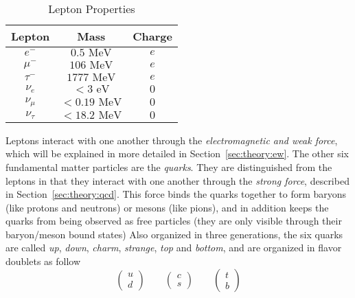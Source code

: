 \begin{table}[h!]
\begin{center}
\begin{tabular}{|c|c|c|}%
\hline
Lepton        & Mass           & Charge \\%
\hline
$e^{-}$      & $0.5 \mbox{ MeV}$      & $e$ \\%
$\mu^{-}$    & $106 \mbox{ MeV}$      & $e$ \\%
$\tau^{-}$   & $1777 \mbox{ MeV}$     & $e$ \\%
\hline                                      
$\nu_{e}$    & $< 3 \mbox{ eV}$       & $0$ \\%
$\nu_{\mu}$  & $< 0.19 \mbox{ MeV}$   & $0$ \\%
$\nu_{\tau}$ & $< 18.2 \mbox{ MeV}$   & $0$  \\%
\hline
\end{tabular}
\end{center}
\caption{Lepton Properties}
\label{table:theory:lepprop}
\end{table}
Leptons interact with one another through the \emph{electromagnetic and weak force}, which will be explained in more detailed in Section~\ref{sec:theory:ew}.\newline
The other six fundamental matter particles are the \emph{quarks}. They are distinguished from the leptons in that they interact with one another through the \emph{strong force}, described in Section~\ref{sec:theory:qcd}. This force binds the quarks together to form baryons (like protons and neutrons) or mesons (like pions), and in addition keeps the quarks from being observed as free particles (they are only visible through their baryon/meson bound states) Also organized in three generations, the six quarks are called \textit{up}, \textit{down}, \textit{charm}, \textit{strange}, \textit{top} and \textit{bottom}, and are organized in flavor doublets as follow
\begin{equation}
\label{eqn:quark_flavor_doublets}
\begin{pmatrix} u \\ d \end{pmatrix} \qquad
\begin{pmatrix} c \\ s \end{pmatrix} \qquad
\begin{pmatrix} t \\ b \end{pmatrix}
\end{equation}
